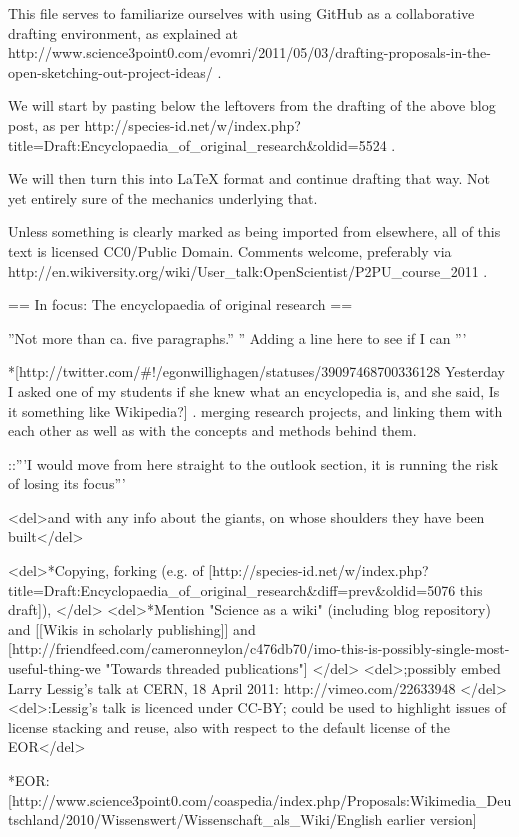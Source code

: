This file serves to familiarize ourselves with using GitHub as a collaborative drafting environment, 
as explained at 
http://www.science3point0.com/evomri/2011/05/03/drafting-proposals-in-the-open-sketching-out-project-ideas/ . 

We will start by pasting below the leftovers from the drafting of the above blog post, as per 
http://species-id.net/w/index.php?title=Draft:Encyclopaedia_of_original_research&oldid=5524 . 

We will then turn this into LaTeX format and continue drafting that way. Not yet entirely sure of the mechanics underlying that. 

Unless something is clearly marked as being imported from elsewhere, all of this text is licensed CC0/Public Domain. Comments welcome, preferably via 
http://en.wikiversity.org/wiki/User_talk:OpenScientist/P2PU_course_2011 .


== In focus: The encyclopaedia of original research ==

''Not more than ca. five paragraphs.''
'' Adding a line here to see if I can '''

*[http://twitter.com/#!/egonwillighagen/statuses/39097468700336128 Yesterday I asked one of my students if she knew what an encyclopedia is, and she said, Is it something like Wikipedia?]
. merging research projects, and linking them with each other as well as with the concepts and methods behind them.

::'''I would move from here straight to the outlook section, it is running the risk of losing its focus'''

<del>and with any info about the giants, on whose shoulders they have been built</del>

<del>*Copying, forking (e.g. of [http://species-id.net/w/index.php?title=Draft:Encyclopaedia_of_original_research&diff=prev&oldid=5076 this draft]), </del>
<del>*Mention "Science as a wiki" (including blog repository) and [[Wikis in scholarly publishing]] and [http://friendfeed.com/cameronneylon/c476db70/imo-this-is-possibly-single-most-useful-thing-we "Towards threaded publications"] </del>
<del>;possibly embed Larry Lessig's talk at CERN, 18 April 2011: http://vimeo.com/22633948 </del>
<del>:Lessig's talk is licenced under CC-BY; could be used to highlight issues of license stacking and reuse, also with respect to the default license of the EOR</del>

*EOR: [http://www.science3point0.com/coaspedia/index.php/Proposals:Wikimedia_Deutschland/2010/Wissenswert/Wissenschaft_als_Wiki/English earlier version]


